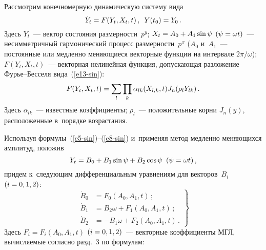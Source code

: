 \begin{multicols}{2}
\smallskip

Рассмотрим конечномерную динамическую сис\-те\-му вида
\begin{equation}
\dot Y_t = F (Y_t, X_t, t)\,,\enskip Y(t_0) = Y_0\,.
\label{e36-sin}
\end{equation}
Здесь $Y_t$~--- вектор состояния размерности~$p^y$; $X_t \hm= A_0 \hm+
A_1\sin \psi$ $(\psi \hm=\omega t)$~--- несимметричный гармонический процесс 
размерности~$p^x$ ($A_0$ и~$A_1$~--- постоянные или медленно меняющиеся 
векторные функции на интервале $2\pi/\omega$); 
$F(Y_t, X_t, t)$~--- векторная нелинейная функция, допускающая разложение 
Фурье--Бес\-се\-ля вида~(\ref{e13-sin}):
\begin{equation}
F(Y_t, X_t, t) = \sum\limits_l\prod_k \alpha_{lk} (X_{l,k}, t) J_n (\rho_l Y_{lk})\,.
\label{e37-sin}
\end{equation}
Здесь $\alpha_{lk}$~--- известные коэффициенты; $\rho_l$~--- положительные 
корни $J_n (y)$, расположенные в~порядке возрастания.

Используя формулы~(\ref{e5-sin})--(\ref{e8-sin}) и~применяя метод медленно 
меняющихся амплитуд, положив
    \begin{equation}
    Y_t = B_0 + B_1 \sin\psi + B_2 \cos \psi \enskip ( \psi = \omega t)\,,
    \label{e38-sin}
    \end{equation}
придем к~следующим дифференциальным уравнениям для векторов~$B_i$ $(i\hm=0,1,2)$:
    \begin{equation}
    \left.
    \begin{array}{rl}
    \dot B_0 &= F_0 (A_0, A_1, t)\,;\\[6pt] 
    \dot B_1 &= B_2 \omega + F_1 (A_0, A_1, t)\,;\\[6pt] 
    \dot B_2 &=-B_1\omega + F_2 (A_0, A_1, t)\,.
    \end{array}
    \right\}
    \label{e39-sin}
    \end{equation}
Здесь $F_i = F_i (A_0, A_1, t)$ $(i\hm=0,1,2)$~--- векторные коэффициенты МГЛ, 
вычисляемые согласно разд.~3 по формулам:


\end{multicols}

